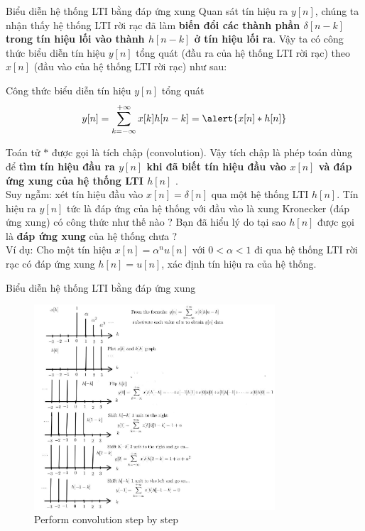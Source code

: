 \documentclass[8pt]{beamer}
\begin{document}
\begin{frame}{Biểu diễn hệ thống LTI bằng đáp ứng xung}
	Quan sát tín hiệu ra $y[n]$, chúng ta nhận thấy hệ thống LTI rời rạc đã làm \textbf{biến đổi các thành phần $\delta[n-k]$ trong tín hiệu lối vào thành $h[n-k]$ ở tín hiệu lối ra}. Vậy ta có công thức biểu diễn tín hiệu $y[n]$ tổng quát (đầu ra của hệ thống LTI rời rạc) theo $x[n]$ (đầu vào của hệ thống LTI rời rạc) như sau:
	\begin{block}{Công thức biểu diễn tín hiệu $y[n]$ tổng quát}
		$$y[n]=\sum_{k=-\infty}^{+\infty}x[k]h[n-k]=\alert{x[n]*h[n]}$$
	\end{block}
	Toán tử $*$ được gọi là \alert{tích chập} (convolution). Vậy \alert{tích chập} là phép toán dùng để \textbf{tìm tín hiệu đầu ra $y[n]$ khi đã biết tín hiệu đầu vào $x[n]$ và đáp ứng xung của hệ thống LTI $h[n]$ }.
	\\ Suy ngẫm: xét tín hiệu đầu vào $x[n]=\delta[n]$ qua một hệ thống LTI $h[n]$. Tín hiệu ra $y[n]$ tức là đáp ứng của hệ thống với đầu vào là xung Kronecker (đáp ứng xung) có công thức như thế nào ? Bạn đã hiểu lý do tại sao $h[n]$ được gọi là \textbf{đáp ứng xung} của hệ thống chưa ?
	\\ Ví dụ: Cho một tín hiệu $x[n]=\alpha^{n}u[n]$ với $0<\alpha<1$ đi qua hệ thống LTI rời rạc có đáp ứng xung $h[n]=u[n]$, xác định tín hiệu ra của hệ thống.
\end{frame}
\begin{frame}{Biểu diễn hệ thống LTI bằng đáp ứng xung}

\begin{figure}[h]
			\includegraphics[width=0.8\textwidth]{conv.jpg}
			\caption{Perform convolution step by step}\label{fig:re4}
		\end{figure}
\end{frame}
\end{document}
